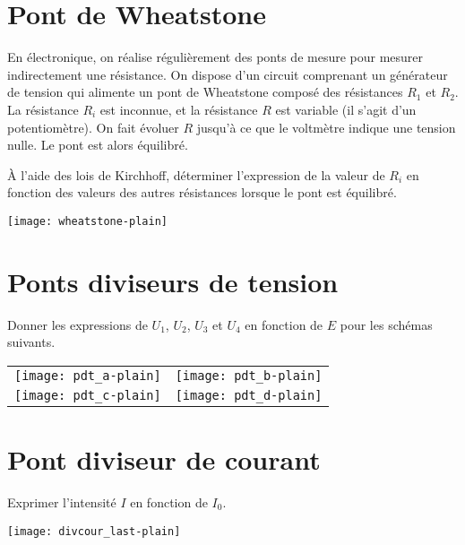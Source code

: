 \documentclass[a4paper, 12pt, final, garamond]{book}
\begin{document}
\section{Pont de Wheatstone}

\begin{minipage}{0.65\linewidth}
    En électronique, on réalise régulièrement des ponts de mesure pour mesurer
    indirectement une résistance. On dispose d'un circuit comprenant un
    générateur de tension qui alimente un pont de Wheatstone composé des
    résistances $R_1$ et $R_2$. La résistance $R_i$ est inconnue, et la
    résistance $R$ est variable (il s'agit d'un potentiomètre). On fait évoluer
    $R$ jusqu'à ce que le voltmètre indique une tension nulle. Le pont est alors
    équilibré. \bigbreak

    À l'aide des lois de Kirchhoff, déterminer l'expression de la valeur de
    $R_i$ en fonction des valeurs des autres résistances lorsque le pont est
    équilibré.
\end{minipage}
\begin{minipage}{0.35\linewidth}
    \begin{center}
        \texttt{[image: wheatstone-plain]}
    \end{center}
\end{minipage}

\section{Ponts diviseurs de tension}
\begin{minipage}{0.50\linewidth}
    Donner les expressions de $U_1$, $U_2$, $U_3$ et $U_4$ en fonction de $E$ pour
les schémas suivants.\linebreak
\end{minipage}
\begin{minipage}{0.50\linewidth}
    \begin{tabularx}{\linewidth}{Y*{1}{Y}}
        \texttt{[image: pdt\_a-plain]} &
        \texttt{[image: pdt\_b-plain]}\\
        \texttt{[image: pdt\_c-plain]} &
        \texttt{[image: pdt\_d-plain]}\\
    \end{tabularx}
\end{minipage}

\section{Pont diviseur de courant}
Exprimer l'intensité $I$ en fonction de $I_0$.
\begin{center}
    \texttt{[image: divcour\_last-plain]}
\end{center}
\end{document}
